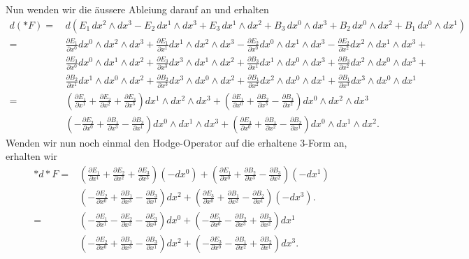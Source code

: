 Nun wenden wir die äussere Ableiung darauf an und erhalten
\begin{align*}
	d(\ast F) = \,
	& d (E_{1} \, dx^2 \wedge dx^3 - E_{2} \, dx^1 \wedge dx^3 + E_{3} \, dx^1 \wedge dx^2 + B_3 \, dx^0 \wedge dx^3 + B_2 \, dx^0 \wedge dx^2 + B_1 \, dx^0 \wedge dx^1)\\
	=
	& \frac{\partial E_1}{\partial x^0} dx^0 \wedge dx^2 \wedge dx^3 + \frac{\partial E_1}{\partial x^1} dx^1 \wedge dx^2 \wedge dx^3 -
	\frac{\partial E_2}{\partial x^0} dx^0 \wedge dx^1 \wedge dx^3 -
	\frac{\partial E_2}{\partial x^2} dx^2 \wedge dx^1 \wedge dx^3 +\\
	& \frac{\partial E_3}{\partial x^0} dx^0 \wedge dx^1 \wedge dx^2 +
	\frac{\partial E_3}{\partial x^3} dx^3 \wedge dx^1 \wedge dx^2 +
	\frac{\partial B_3}{\partial x^1} dx^1 \wedge dx^0 \wedge dx^3 +
	\frac{\partial B_3}{\partial x^2} dx^2 \wedge dx^0 \wedge dx^3 +\\
	& \frac{\partial B_2}{\partial x^1} dx^1 \wedge dx^0 \wedge dx^2 +
	\frac{\partial B_2}{\partial x^3} dx^3 \wedge dx^0 \wedge dx^2 +
	\frac{\partial B_1}{\partial x^2} dx^2 \wedge dx^0 \wedge dx^1 +
	\frac{\partial B_1}{\partial x^3} dx^3 \wedge dx^0 \wedge dx^1\\
	=
	&\left( \frac{\partial E_1}{\partial x^1} + \frac{\partial E_2}{\partial x^2} + \frac{\partial E_3}{\partial x^3} \right) dx^1 \wedge dx^2 \wedge dx^3 +
	\left(\frac{\partial E_1}{\partial x^0} + \frac{\partial B_2}{\partial x^3} - \frac{\partial B_3}{\partial x^2} \right) dx^0 \wedge dx^2 \wedge dx^3\\
	&\left( -\frac{\partial E_2}{\partial x^0} + \frac{\partial B_1}{\partial x^3} - \frac{\partial B_3}{\partial x^1} \right) dx^0 \wedge dx^1 \wedge dx^3 +
	\left( \frac{\partial E_3}{\partial x^0} + \frac{\partial B_1}{\partial x^2} - \frac{\partial B_2}{\partial x^1} \right) dx^0 \wedge dx^1 \wedge dx^2. 
\end{align*}
Wenden wir nun noch einmal den Hodge-Operator auf die erhaltene 3-Form an, erhalten wir
\begin{align*}
	\ast d \ast F = 
	&\left( \frac{\partial E_1}{\partial x^1} + \frac{\partial E_2}{\partial x^2} + \frac{\partial E_3}{\partial x^3} \right) (-dx^0) +
	\left(\frac{\partial E_1}{\partial x^0} + \frac{\partial B_2}{\partial x^3} - \frac{\partial B_3}{\partial x^2} \right) (-dx^1)\\
	&\left( -\frac{\partial E_2}{\partial x^0} + \frac{\partial B_1}{\partial x^3} - \frac{\partial B_3}{\partial x^1} \right) dx^2 +
	\left( \frac{\partial E_3}{\partial x^0} + \frac{\partial B_1}{\partial x^2} - \frac{\partial B_2}{\partial x^1} \right) (-dx^3).\\
	=
	&\left( -\frac{\partial E_1}{\partial x^1} -\frac{\partial E_2}{\partial x^2} - \frac{\partial E_3}{\partial x^3} \right) dx^0 +
	\left(-\frac{\partial E_1}{\partial x^0} - \frac{\partial B_2}{\partial x^3} + \frac{\partial B_3}{\partial x^2} \right) dx^1\\
	&\left( -\frac{\partial E_2}{\partial x^0} + \frac{\partial B_1}{\partial x^3} - \frac{\partial B_3}{\partial x^1} \right) dx^2 +
	\left( -\frac{\partial E_3}{\partial x^0} - \frac{\partial B_1}{\partial x^2} + \frac{\partial B_2}{\partial x^1} \right) dx^3.
\end{align*}

